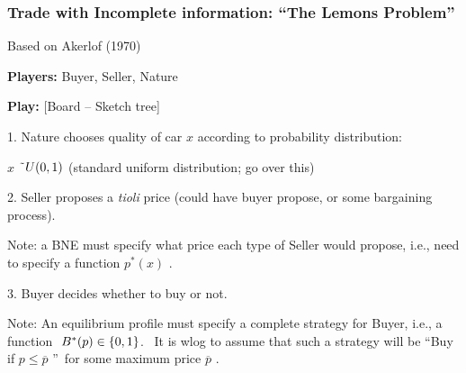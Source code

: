 \documentclass[handout]{beamer}
\begin{document}
\begin{frame}%

\frametitle{\textbf{Trade with Incomplete information: ``The Lemons
Problem''}} {\footnotesize Based on Akerlof (1970)}\medskip

\textbf{Players:} Buyer, Seller, Nature

\medskip 
\pause%

\textbf{Play: }{\footnotesize [Board -- Sketch tree]}

1. Nature chooses quality of car $x$ according to probability distribution:

$x$ $\symbol{126}U(0,1)$ {\footnotesize (standard uniform distribution; go
over this)}\medskip

\medskip 
\pause%
2. Seller proposes a \textit{tioli} price {\footnotesize (could have buyer
propose, or some bargaining process)}.

{\footnotesize Note: a BNE must specify what price each type of Seller would
propose, i.e., need to specify a function }$p^{\ast }(x)${\footnotesize %
.\medskip }

\medskip 
\pause%
3. Buyer decides whether to buy or not.

\medskip 
\pause%
{\footnotesize Note: An equilibrium profile must specify a complete strategy
for Buyer, i.e., a function }$\ {\footnotesize B}^{\ast }{\footnotesize %
(p)\in \{0,1\}}${\footnotesize . \ It is wlog to assume that such a strategy
will be \textquotedblleft Buy if }$p\leq \overline{p}${\footnotesize %
\textquotedblright\ for some maximum price }$\overline{p}${\footnotesize %
.\medskip }

\end{frame}%
\end{document}
